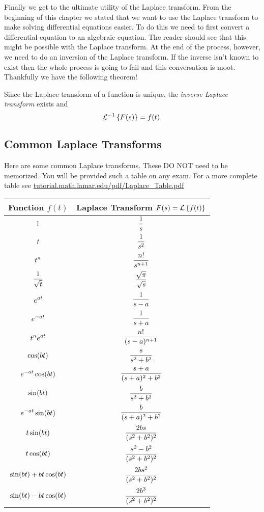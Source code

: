 Finally we get to the ultimate utility of the Laplace transform.  From the beginning of
this chapter we stated that we want to use the Laplace transform to make solving
differential equations easier.  To do this we need to first convert a differential
equation to an algebraic equation.  The reader should see that this might be possible with
the Laplace transform.  At the end of the process, however, we need to do an inversion of
the Laplace transform.  If the inverse isn't known to exist then the whole process is
going to fail and this conversation is moot.  Thankfully we have the following theorem!
\begin{thm}
    Since the Laplace transform of a function is unique, the {\it inverse Laplace
    transform} exists and
    \[ \mathcal{L}^{-1}\left\{ F(s) \right\} = f(t). \]
\end{thm}


\subsection{Common Laplace Transforms}
Here are some common Laplace transforms.  These DO NOT need to be memorized.  You will be
provided such a table on any exam.  For a more complete table see
\href{http://tutorial.math.lamar.edu/pdf/Laplace_Table.pdf}{tutorial.math.lamar.edu/pdf/Laplace\_Table.pdf}
\begin{center}
    \setlength\extrarowheight{10pt}
    \begin{tabular}{|c|c|}
        \hline
        Function $f(t)$ & Laplace Transform $F(s) = \mathcal{L}\left\{ f(t) \right\}$ \\ \hline \hline
        $\displaystyle 1$ & $\displaystyle \frac{1}{s}$ \\\hline
        $\displaystyle t$ & $\displaystyle \frac{1}{s^2}$ \\\hline
        $\displaystyle t^n$ & $\displaystyle \frac{n!}{s^{n+1}}$ \\\hline
        $\displaystyle \frac{1}{\sqrt{t}}$ & $\displaystyle \frac{\sqrt{\pi}}{\sqrt{s}}$ \\\hline
        $\displaystyle e^{at}$ & $\displaystyle \frac{1}{s-a}$ \\\hline
        $\displaystyle e^{-at}$ & $\displaystyle \frac{1}{s+a}$ \\\hline
        $\displaystyle t^n e^{at}$ & $\displaystyle \frac{n!}{(s-a)^{n+1}}$ \\\hline
        $\displaystyle \cos(bt)$ & $\displaystyle \frac{s}{s^2 + b^2}$ \\\hline
        $\displaystyle e^{-at}\cos(bt)$ & $\displaystyle \frac{s+a}{(s+a)^2+b^2}$ \\\hline
        $\displaystyle \sin(bt)$ & $\displaystyle \frac{b}{s^2+b^2}$ \\\hline
        $\displaystyle e^{-at}\sin(bt)$ & $\displaystyle \frac{b}{(s+a)^2+b^2}$ \\\hline
        $\displaystyle t \sin(bt)$ & $\displaystyle \frac{2bs}{(s^2+b^2)^2}$ \\\hline
        $\displaystyle t \cos(bt)$ & $\displaystyle \frac{s^2-b^2}{(s^2+b^2)^2}$ \\\hline
        $\displaystyle \sin(bt) + bt \cos(bt)$ & $\displaystyle \frac{2bs^2}{(s^2+b^2)^2}$ \\\hline
        $\displaystyle \sin(bt) - bt \cos(bt)$ & $\displaystyle \frac{2b^3}{(s^2+b^2)^2}$ \\\hline
    \end{tabular}
\end{center}

